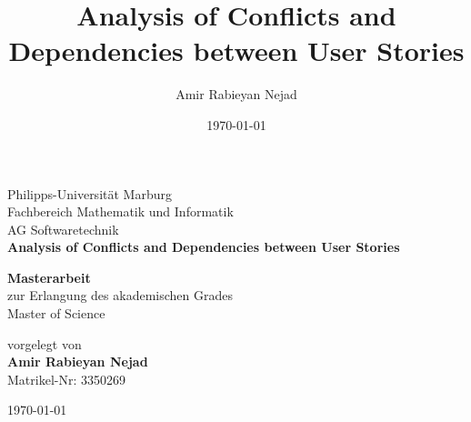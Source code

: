 \documentclass[11pt,a4paper]{article}
\title{Analysis of Conflicts and Dependencies between User Stories}
\author{Amir Rabieyan Nejad}
\date{\today}
\numberwithin{equation}{section}
\begin{document}
\begin{titlepage}
    \begin{center}
        \vspace*{1cm}
        \Large
        Philipps-Universität Marburg\\
        Fachbereich Mathematik und Informatik\\
        AG Softwaretechnik \\
        \vspace*{1cm}
        \Large
        \textbf{Analysis of Conflicts and Dependencies between User Stories}
            
      
        \vspace{1.5cm}
            
        \textbf{Masterarbeit}\\
        zur Erlangung des akademischen Grades \\
        Master of Science
        
        \vspace{1.5cm}
        vorgelegt von\\
        \textbf{Amir Rabieyan Nejad}\\
        Matrikel-Nr: 3350269
            
    
            
        \vspace{1.5cm}
            
        
            
        
        
        \today\\
        
    \end{center}
\end{titlepage}
\pagestyle{empty}
\newpage\null\newpage

\newpage\null\newpage


\newpage
\pagestyle{plain}
\tableofcontents
\newpage\null\newpage








\newpage



   
\end{document}
